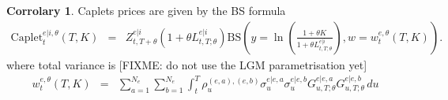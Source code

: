 \documentclass[11pt,english]{amsart}
\newcommand{\RN}{\mathrm{RN}}
\newcommand{\BS}{\mathrm{BS}}
\newcommand{\EE}{\mathbb{E}}
\theoremstyle{definition}
\newtheorem{coro}{Corrolary}
\begin{document}
\begin{coro}
Caplets prices are given by the BS formula
\begin{eqnarray}
  \mathrm{Caplet}^{e|i,\theta}_{t}(T,K) 
  &=&  Z^{e|i}_{t,T+\theta} \left( 1+\theta L^{e|i}_{t,T;\theta} \right)\BS\left(y = \ln \left( \tfrac{1+\theta K}{ 1+\theta L^{e|i}_{t,T;\theta} } \right), w = w^{e,\theta}_t(T,K) \right) .
\end{eqnarray} 
where total variance is [FIXME: do not use the LGM parametrisation yet]
\begin{eqnarray}
  w^{e,\theta}_t(T,K)
  &=&  \sum_{a=1}^{N_e}  \sum_{b=1}^{N_{e}} \int_t^T  \rho^{(e,a),(e,b)}_u \sigma^{e|e,a}_u \sigma^{e|e,b}_u  G^{e|e,a}_{u,T;\theta} G^{e|e,b}_{u,T;\theta} \, du  
\end{eqnarray} 
\end{coro}
\end{document}
